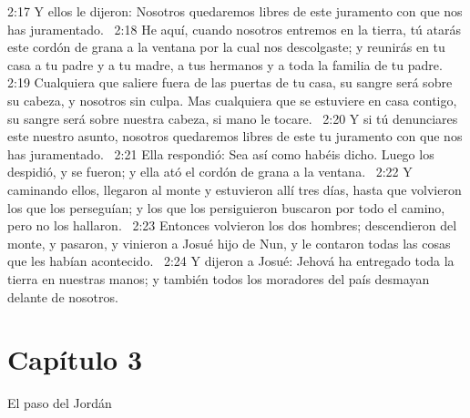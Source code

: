 2:17 Y ellos le dijeron: Nosotros quedaremos libres de este juramento con que nos has juramentado.  
2:18 He aquí, cuando nosotros entremos en la tierra, tú atarás este cordón de grana a la ventana por la cual nos descolgaste; y reunirás en tu casa a tu padre y a tu madre, a tus hermanos y a toda la familia de tu padre.  
2:19 Cualquiera que saliere fuera de las puertas de tu casa, su sangre será sobre su cabeza, y nosotros sin culpa. Mas cualquiera que se estuviere en casa contigo, su sangre será sobre nuestra cabeza, si mano le tocare.  
2:20 Y si tú denunciares este nuestro asunto, nosotros quedaremos libres de este tu juramento con que nos has juramentado.  
2:21 Ella respondió: Sea así como habéis dicho. Luego los despidió, y se fueron; y ella ató el cordón de grana a la ventana.  
2:22 Y caminando ellos, llegaron al monte y estuvieron allí tres días, hasta que volvieron los que los perseguían; y los que los persiguieron buscaron por todo el camino, pero no los hallaron.  
2:23 Entonces volvieron los dos hombres; descendieron del monte, y pasaron, y vinieron a Josué hijo de Nun, y le contaron todas las cosas que les habían acontecido.  
2:24 Y dijeron a Josué: Jehová ha entregado toda la tierra en nuestras manos; y también todos los moradores del país desmayan delante de nosotros.  
\section*{Capítulo 3}
El paso del Jordán  

